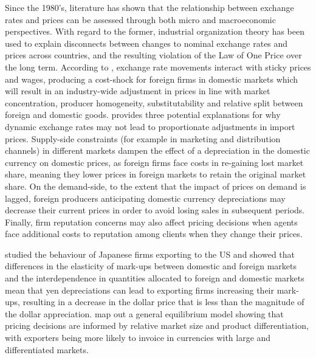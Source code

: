 \documentclass[12pt]{article}
\begin{document}
Since the 1980’s, literature has shown that the relationship between exchange rates and prices can be assessed through both micro and macroeconomic perspectives. With regard to the former, industrial organization theory has been used to explain disconnects between changes to nominal exchange rates and prices across countries, and the resulting violation of the Law of One Price over the long term. According to \textcite{dornbusch1985exchange}, exchange rate movements interact with sticky prices and wages, producing a cost-shock for foreign firms in domestic markets which will result in an industry-wide adjustment in prices in line with market concentration, producer homogeneity, substitutability and relative split between foreign and domestic goods. \textcite{krugman1986} provides three potential explanations for why dynamic exchange rates may not lead to proportionate adjustments in import prices. Supply-side constraints (for example in marketing and distribution channels) in different markets dampen the effect of a depreciation in the domestic currency on domestic prices, as foreign firms face costs in re-gaining lost market share, meaning they lower prices in foreign markets to retain the original market share. On the demand-side, to the extent that the impact of prices on demand is lagged, foreign producers anticipating domestic currency depreciations may decrease their current prices in order to avoid losing sales in subsequent periods. Finally, firm reputation concerns may also affect pricing decisions when agents face additional costs to reputation among clients when they change their prices.

 \textcite{marston1990pricing} studied the behaviour of Japanese firms exporting to the US and showed that differences in the elasticity of mark-ups between domestic and foreign markets and the interdependence in quantities allocated to foreign and domestic markets mean that yen depreciations can lead to exporting firms increasing their mark-ups, resulting in a decrease in the  dollar price that is less than the magnitude of the dollar appreciation. \textcite{bacchetta2005theory} map out a general equilibrium model showing that pricing decisions are informed by relative market size and product differentiation, with exporters being more likely to invoice in currencies with large and differentiated markets. 
\end{document}
